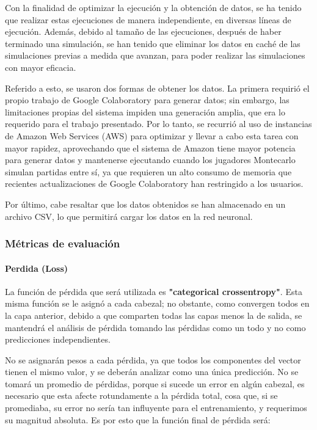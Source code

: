Con la finalidad de optimizar la ejecución y la obtención de datos, se ha tenido que realizar estas ejecuciones de manera independiente, en diversas líneas de ejecución. Además, debido al tamaño de las ejecuciones, después de haber terminado una simulación, se han tenido que eliminar los datos en caché de las simulaciones previas a medida que avanzan, para poder realizar las simulaciones con mayor eficacia.

Referido a esto, se usaron dos formas de obtener los datos. La primera requirió el propio trabajo de Google Colaboratory para generar datos; sin embargo, las limitaciones propias del sistema impiden una generación amplia, que era lo requerido para el trabajo presentado. Por lo tanto, se recurrió al uso de instancias de Amazon Web Services (AWS) para optimizar y llevar a cabo esta tarea con mayor rapidez, aprovechando que el sistema de Amazon tiene mayor potencia para generar datos y mantenerse ejecutando cuando los jugadores Montecarlo simulan partidas entre sí, ya que requieren un alto consumo de memoria que recientes actualizaciones de Google Colaboratory han restringido a los usuarios.

Por último, cabe resaltar que los datos obtenidos se han almacenado en un archivo CSV, lo que permitirá cargar los datos en la red neuronal.

\subsubsection{Métricas de evaluación}

\paragraph{Perdida (Loss)}
La función de pérdida que será utilizada es \textbf{"categorical crossentropy"}. Esta misma función se le asignó a cada cabezal; no obstante, como convergen todos en la capa anterior, debido a que comparten todas las capas menos la de salida, se mantendrá el análisis de pérdida tomando las pérdidas como un todo y no como predicciones independientes.

No se asignarán pesos a cada pérdida, ya que todos los componentes del vector tienen el mismo valor, y se deberán analizar como una única predicción. No se tomará un promedio de pérdidas, porque si sucede un error en algún cabezal, es necesario que esta afecte rotundamente a la pérdida total, cosa que, si se promediaba, su error no sería tan influyente para el entrenamiento, y requerimos su magnitud absoluta. Es por esto que la función final de pérdida será:

